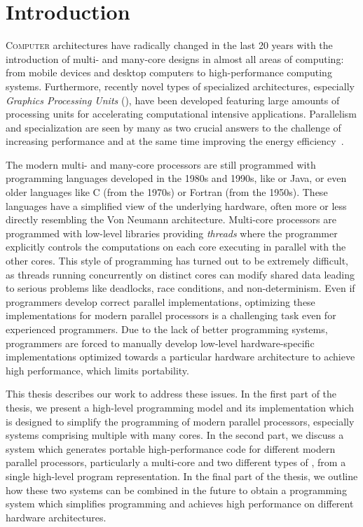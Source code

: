 
\chapter{Introduction} %

\label{ch:introduction} %

\lettrine[lines=3, loversize=0.1]{C}{omputer} architectures have radically changed in the last 20 years with the introduction of multi- and many-core designs in almost all areas of computing:
from mobile devices and desktop computers to high-performance computing systems.
Furthermore, recently novel types of specialized architectures, especially \emph{Graphics Processing Units} (\GPUs), have been developed featuring large amounts of processing units for accelerating computational intensive applications.
Parallelism and specialization are seen by many as two crucial answers to the challenge of increasing performance and at the same time improving the energy efficiency~\cite{OlukotunH05,GarlandK10}.

The modern multi- and many-core processors are still programmed with programming languages developed in the 1980s and 1990s, like \Cpp or Java, or even older languages like C (from the 1970s) or Fortran (from the 1950s).
These languages have a simplified view of the underlying hardware, often more or less directly resembling the Von Neumann architecture.
Multi-core processors are programmed with low-level libraries providing \emph{threads} where the programmer explicitly controls the computations on each core executing in parallel with the other cores.
This style of programming has turned out to be extremely difficult, as threads running concurrently on distinct cores can modify shared data leading to serious problems like deadlocks, race conditions, and non-determinism.
Even if programmers develop correct parallel implementations, optimizing these implementations for modern parallel processors is a challenging task even for experienced programmers.
Due to the lack of better programming systems, programmers are forced to manually develop low-level hardware-specific implementations optimized towards a particular hardware architecture to achieve high performance, which limits portability.

This thesis describes our work to address these issues.
In the first part of the thesis, we present a high-level programming model and its implementation which is designed to simplify the programming of modern parallel processors, especially systems comprising multiple \GPUs with many cores.
In the second part, we discuss a system which generates portable high-performance code for different modern parallel processors, particularly a multi-core \CPU and two different types of \GPUs, from a single high-level program representation.
In the final part of the thesis, we outline how these two systems can be combined in the future to obtain a programming system which simplifies programming and achieves high performance on different hardware architectures.

